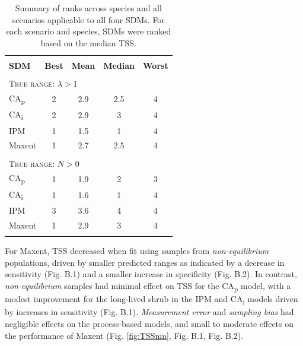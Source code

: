 \documentclass[preprint,review,times,12pt]{elsarticle}
\begin{document}
\begin{table}
	\centering
	\captionsetup{width=.75\textwidth}
	\begin{tabular}{l c c c c}
		\hline \\[-3.5ex]
		\textbf{SDM} & \textbf{Best} & \textbf{Mean} & \textbf{Median} & \textbf{Worst}\\
		\hline 
		\hline \\[-2.5ex]
		\multicolumn{5}{l}{\textsc{True range: $\lambda > 1$}} \\
		CA\textsubscript{p} & 2 & 2.9 & 2.5 & 4\\
		CA\textsubscript{i} & 2 & 2.9 & 3 & 4\\
		IPM & 1 & 1.5 & 1 & 4\\
		Maxent & 1 & 2.7 & 2.5 & 4\\
		[.5ex]\hline \\[-2.5ex]
		\multicolumn{5}{l}{\textsc{True range: $N > 0$}} \\
		CA\textsubscript{p} & 1 & 1.9 & 2 & 3\\
		CA\textsubscript{i} & 1 & 1.6 & 1 & 4\\
		IPM & 3 & 3.6 & 4 & 4\\
		Maxent & 1 & 2.9 & 3 & 4\\
		[.5ex]\hline \\[-2ex]
	\end{tabular}
	\caption{\label{table:ranks}Summary of ranks across species and all scenarios applicable to all four SDMs. For each scenario and species, SDMs were ranked based on the median TSS.}
\end{table}

For Maxent, TSS decreased when fit using samples from \emph{non-equilibrium} populations, driven by smaller predicted ranges as indicated by a decrease in sensitivity (Fig. B.1) and a smaller increase in specificity (Fig. B.2). In contrast, \emph{non-equilibrium} samples had minimal effect on TSS for the CA\textsubscript{p} model, with a modest improvement for the long-lived shrub in the IPM and CA\textsubscript{i} models driven by increases in sensitivity (Fig. B.1). \emph{Measurement error} and \emph{sampling bias} had negligible effects on the process-based models, and small to moderate effects on the performance of Maxent (Fig. \ref{fig:TSSmn}, Fig. B.1, Fig. B.2). 
\end{document}
